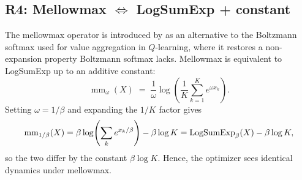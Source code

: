 \subsection{R4: Mellowmax $\Leftrightarrow$ LogSumExp + constant}

The mellowmax operator is introduced by \citet{asadi_alternative_2017} as an alternative to the Boltzmann softmax used for value aggregation in $Q$-learning, where it restores a non-expansion property Boltzmann softmax lacks. Mellowmax is equivalent to LogSumExp up to an additive constant:
\begin{equation}
    \operatorname{mm}_{\omega}(X)
    \;=\; \frac{1}{\omega}\log\!\left(\frac{1}{K}\sum_{k=1}^{K} e^{\omega x_k}\right).
    \label{eq:mellowmax}
\end{equation}
Setting $\omega = 1/\beta$ and expanding the $1/K$ factor gives
\begin{equation}
    \operatorname{mm}_{1/\beta}(X)
    = \beta \log\!\left(\sum_k e^{x_k/\beta}\right) - \beta \log K
    = \operatorname{LogSumExp}_\beta(X) - \beta \log K,
    \label{eq:mellowmax_to_lse}
\end{equation}
so the two differ by the constant $\beta \log K$. Hence, the optimizer sees identical dynamics under mellowmax.